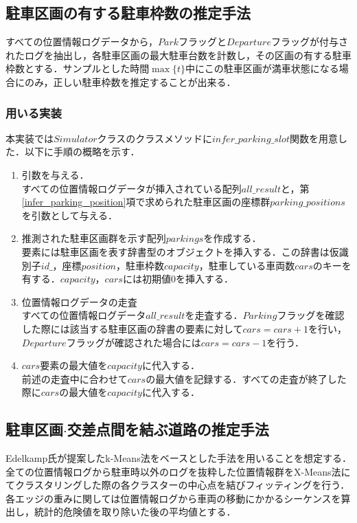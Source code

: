 \subsection{駐車区画の有する駐車枠数の推定手法}
すべての位置情報ログデータから，$Park$フラッグと$Departure$フラッグが付与されたログを抽出し，各駐車区画の最大駐車台数を計数し，その区画の有する駐車枠数とする．サンプルとした時間$\max\{t\}$中にこの駐車区画が満車状態になる場合にのみ，正しい駐車枠数を推定することが出来る．
\subsubsection{用いる実装}
本実装では$Simulator$クラスのクラスメソッドに$infer\_parking\_slot$関数を用意した．以下に手順の概略を示す．

\begin{enumerate}
	\item 引数を与える．\\
	      すべての位置情報ログデータが挿入されている配列$all\_result$と，第\ref{infer_parking_position}項で求められた駐車区画の座標群$parking\_positions$を引数として与える．
	\item 推測された駐車区画群を示す配列$parkings$を作成する．\\
	      要素には駐車区画を表す辞書型のオブジェクトを挿入する．この辞書は仮識別子$id\_$，座標$position$，駐車枠数$capacity$，駐車している車両数$cars$のキーを有する．$capacity$，$cars$には初期値$0$を挿入する．
	\item 位置情報ログデータの走査 \\
	      すべての位置情報ログデータ$all\_result$を走査する．$Parking$フラッグを確認した際には該当する駐車区画の辞書の要素に対して$cars = cars + 1$を行い，$Departure$フラッグが確認された場合には$cars = cars - 1$を行う．
	\item $cars$要素の最大値を$capacity$に代入する．\\
	      前述の走査中に合わせて$cars$の最大値を記録する．すべての走査が終了した際に$cars$の最大値を$capacity$に代入する．
\end{enumerate}


\subsection{駐車区画$\cdot$交差点間を結ぶ道路の推定手法}
Edelkamp氏が提案したk-Means法をベースとした手法\cite{Edelkamp}を用いることを想定する．
全ての位置情報ログから駐車時以外のログを抜粋した位置情報群をX-Means法にてクラスタリングした際の各クラスターの中心点を結びフィッティングを行う．
各エッジの重みに関しては位置情報ログから車両の移動にかかるシーケンスを算出し，統計的危険値を取り除いた後の平均値とする．

